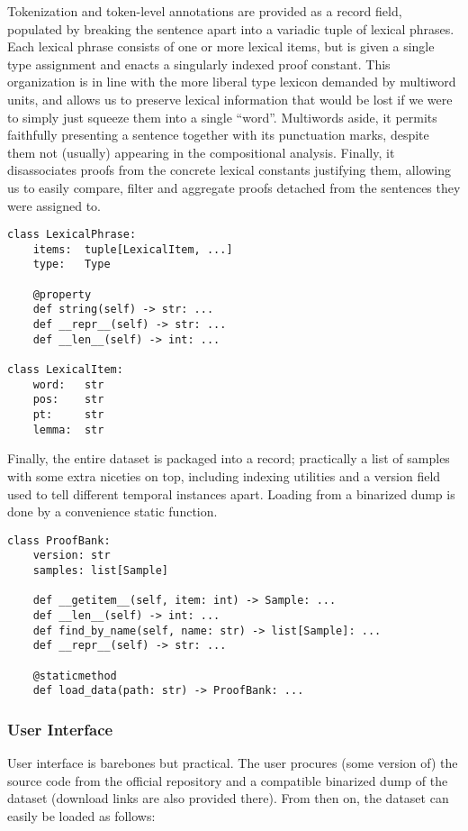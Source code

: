 \noindent Tokenization and token-level annotations are provided as a record field, populated by breaking the sentence apart into a variadic tuple of lexical phrases.
Each lexical phrase consists of one or more lexical items, but is given a single type assignment and enacts a singularly indexed proof constant.
This organization is in line with the more liberal type lexicon demanded by multiword units, and allows us to preserve lexical information that would be lost if we were to simply just squeeze them into a single ``word''.
Multiwords aside, it permits faithfully presenting a sentence together with its punctuation marks, despite them not (usually) appearing in the compositional analysis.
Finally, it disassociates proofs from the concrete lexical constants justifying them, allowing us to easily compare, filter and aggregate proofs detached from the sentences they were assigned to.

\begin{verbatim}
class LexicalPhrase:
    items:  tuple[LexicalItem, ...]
    type:   Type

    @property
    def string(self) -> str: ...
    def __repr__(self) -> str: ...
    def __len__(self) -> int: ...

class LexicalItem:
    word:   str
    pos:    str
    pt:     str
    lemma:  str
\end{verbatim}

\noindent Finally, the entire dataset is packaged into a  record; practically a list of samples with some extra niceties on top, including indexing utilities and a version field used to tell different temporal instances apart.
Loading from a binarized dump is done by a convenience static function.

\begin{verbatim}
class ProofBank:
    version: str
    samples: list[Sample]

    def __getitem__(self, item: int) -> Sample: ...
    def __len__(self) -> int: ...
    def find_by_name(self, name: str) -> list[Sample]: ...
    def __repr__(self) -> str: ...

    @staticmethod
    def load_data(path: str) -> ProofBank: ...
\end{verbatim}

\subsubsection{User Interface}
User interface is barebones but practical.
The user procures (some version of) the source code from the official repository and a compatible binarized dump of the dataset (download links are also provided there).
From then on, the dataset can easily be loaded as follows:

